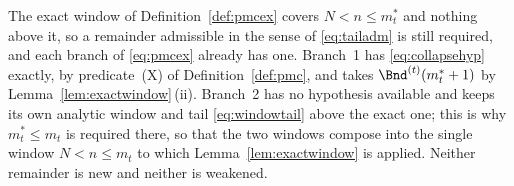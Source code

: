 
\begin{remark}
\label{rem:exact-window-remainders}
The exact window of Definition~\ref{def:pmcex} covers $N<n\le m^{\ast}_t$
and nothing above it, so a remainder admissible in the sense of
\eqref{eq:tailadm} is still required, and each branch of \eqref{eq:pmcex}
already has one. Branch~1 has \eqref{eq:collapsehyp} exactly, by
predicate~(X) of Definition~\ref{def:pmc}, and takes
$\Bnd^{(t)}(m^{\ast}_t+1)$ by Lemma~\ref{lem:exactwindow}\,(ii). Branch~2
has no hypothesis available and keeps its own analytic window and tail
\eqref{eq:windowtail} above the exact one; this is why
$m^{\ast}_t\le m_t$ is required there, so that the two windows compose into
the single window $N<n\le m_t$ to which Lemma~\ref{lem:exactwindow} is
applied. Neither remainder is new and neither is weakened.
\end{remark}
